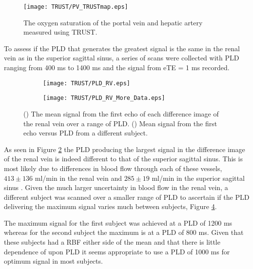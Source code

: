 \begin{figure}[h]
	\centering
	\texttt{[image: TRUST/PV\_TRUSTmap.eps]}
	\caption{The oxygen saturation of the portal vein and hepatic artery measured using \ac{TRUST}.}
	\label{fig:pv_TRUST}	
\end{figure}
To assess if the \ac{PLD} that generates the greatest signal is the same in the renal vein as in the superior sagittal sinus, a series of scans were collected with \ac{PLD} ranging from 400 ms to 1400 ms and the signal from \ac{eTE} = 1 ms recorded.

\begin{figure}[H]
	\centering
	\begin{subfigure}[c]{0.47\textwidth}
		\centering
		\texttt{[image: TRUST/PLD\_RV.eps]}
		\caption{}
		\label{fig:Sig_vs_PLD_RV}
	\end{subfigure}
	\hfill
	\begin{subfigure}[c]{0.47\textwidth}
		\centering
		\texttt{[image: TRUST/PLD\_RV\_More\_Data.eps]}
		\caption{}
		\label{fig:Sig_vs_PLD_RV_more}
	\end{subfigure}
	\caption{() The mean signal from the first echo of each difference image of the renal vein over a range of \ac{PLD}. () Mean signal from the first echo versus \ac{PLD} from a different subject. }
\end{figure}

As seen in Figure \ref{fig:Sig_vs_PLD_RV} the \ac{PLD} producing the largest signal in the difference image of the renal vein is indeed different to that of the superior sagittal sinus. This is most likely due to differences in blood flow through each of these vessels, $413\pm136$ ml/min in the renal vein \cite{cox_multiparametric_2017} and $285\pm19$ ml/min in the superior sagittal sinus \cite{jordan_velocity_1994}. Given the much larger uncertainty in blood flow in the renal vein, a different subject was scanned over a smaller range of \ac{PLD} to ascertain if the \ac{PLD} delivering the maximum signal varies much between subjects, Figure \ref{fig:Sig_vs_PLD_RV_more}.

The maximum signal for the first subject was achieved at a \ac{PLD} of 1200 ms whereas for the second subject the maximum is at a \ac{PLD} of 800 ms. Given that these subjects had a \ac{RBF} either side of the mean and that there is little dependence of \ttwo upon \ac{PLD} it seems appropriate to use a \ac{PLD} of 1000 ms for optimum signal in most subjects.

